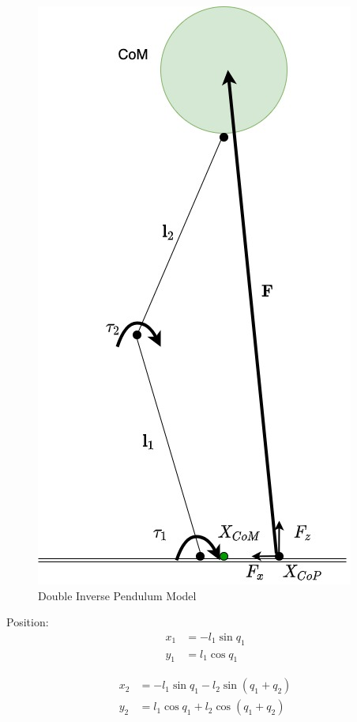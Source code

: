 \begin{figure}[h!]
    \centering
    \includegraphics[scale=0.45]{images/DIPM.jpg}\hfill
    \caption{Double Inverse Pendulum Model}\hfill
    \label{dipm}
\end{figure}

Position:
\begin{equation}
\begin{split}
    x_1 &= -l_1\sin{q_1} \\
    y_1 &= l_1\cos{q_1}
\end{split}
\end{equation}

\begin{equation}
\begin{split}
    x_2 &= -l_1\sin{q_1} - l_2\sin{(q_1+q_2)} \\
    y_2 &= l_1\cos{q_1} + l_2\cos{(q_1+q_2)}
\end{split}
\end{equation}


